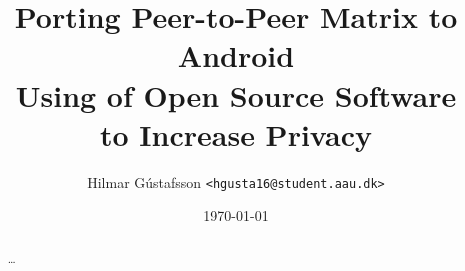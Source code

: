 \documentclass[11pt,notitlepage]{report}
\title{%
	Porting Peer-to-Peer Matrix to Android\\
	\large{%
		Using of Open Source Software\\
		to Increase Privacy
	}
}
\author{Hilmar Gústafsson \texttt{<hgusta16@student.aau.dk>}}
\date{\small\today} 			%
\begin{document}
\sloppy							%
\maketitle
\begin{abstract}
	\ldots
\end{abstract}
\setcounter{tocdepth}{1}
\tableofcontents
{}










\end{document}
